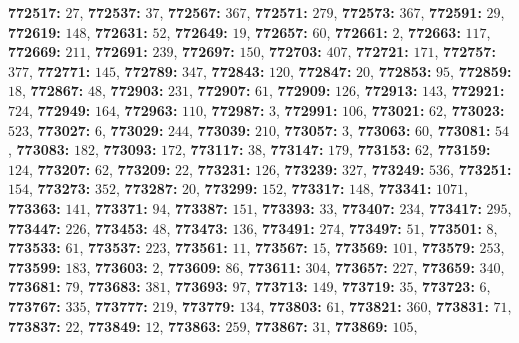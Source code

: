 \textsf{\bfseries 772517:} $27$, \textsf{\bfseries 772537:} $37$, \textsf{\bfseries 772567:} $367$, \textsf{\bfseries 772571:} $279$, \textsf{\bfseries 772573:} $367$, \textsf{\bfseries 772591:} $29$, \textsf{\bfseries 772619:} $148$, \textsf{\bfseries 772631:} $52$, \textsf{\bfseries 772649:} $19$, \textsf{\bfseries 772657:} $60$, \textsf{\bfseries 772661:} $2$, \textsf{\bfseries 772663:} $117$, \textsf{\bfseries 772669:} $211$, \textsf{\bfseries 772691:} $239$, \textsf{\bfseries 772697:} $150$, \textsf{\bfseries 772703:} $407$, \textsf{\bfseries 772721:} $171$, \textsf{\bfseries 772757:} $377$, \textsf{\bfseries 772771:} $145$, \textsf{\bfseries 772789:} $347$, \textsf{\bfseries 772843:} $120$, \textsf{\bfseries 772847:} $20$, \textsf{\bfseries 772853:} $95$, \textsf{\bfseries 772859:} $18$, \textsf{\bfseries 772867:} $48$, \textsf{\bfseries 772903:} $231$, \textsf{\bfseries 772907:} $61$, \textsf{\bfseries 772909:} $126$, \textsf{\bfseries 772913:} $143$, \textsf{\bfseries 772921:} $724$, \textsf{\bfseries 772949:} $164$, \textsf{\bfseries 772963:} $110$, \textsf{\bfseries 772987:} $3$, \textsf{\bfseries 772991:} $106$, \textsf{\bfseries 773021:} $62$, \textsf{\bfseries 773023:} $523$, \textsf{\bfseries 773027:} $6$, \textsf{\bfseries 773029:} $244$, \textsf{\bfseries 773039:} $210$, \textsf{\bfseries 773057:} $3$, \textsf{\bfseries 773063:} $60$, \textsf{\bfseries 773081:} $54$, \textsf{\bfseries 773083:} $182$, \textsf{\bfseries 773093:} $172$, \textsf{\bfseries 773117:} $38$, \textsf{\bfseries 773147:} $179$, \textsf{\bfseries 773153:} $62$, \textsf{\bfseries 773159:} $124$, \textsf{\bfseries 773207:} $62$, \textsf{\bfseries 773209:} $22$, \textsf{\bfseries 773231:} $126$, \textsf{\bfseries 773239:} $327$, \textsf{\bfseries 773249:} $536$, \textsf{\bfseries 773251:} $154$, \textsf{\bfseries 773273:} $352$, \textsf{\bfseries 773287:} $20$, \textsf{\bfseries 773299:} $152$, \textsf{\bfseries 773317:} $148$, \textsf{\bfseries 773341:} $1071$, \textsf{\bfseries 773363:} $141$, \textsf{\bfseries 773371:} $94$, \textsf{\bfseries 773387:} $151$, \textsf{\bfseries 773393:} $33$, \textsf{\bfseries 773407:} $234$, \textsf{\bfseries 773417:} $295$, \textsf{\bfseries 773447:} $226$, \textsf{\bfseries 773453:} $48$, \textsf{\bfseries 773473:} $136$, \textsf{\bfseries 773491:} $274$, \textsf{\bfseries 773497:} $51$, \textsf{\bfseries 773501:} $8$, \textsf{\bfseries 773533:} $61$, \textsf{\bfseries 773537:} $223$, \textsf{\bfseries 773561:} $11$, \textsf{\bfseries 773567:} $15$, \textsf{\bfseries 773569:} $101$, \textsf{\bfseries 773579:} $253$, \textsf{\bfseries 773599:} $183$, \textsf{\bfseries 773603:} $2$, \textsf{\bfseries 773609:} $86$, \textsf{\bfseries 773611:} $304$, \textsf{\bfseries 773657:} $227$, \textsf{\bfseries 773659:} $340$, \textsf{\bfseries 773681:} $79$, \textsf{\bfseries 773683:} $381$, \textsf{\bfseries 773693:} $97$, \textsf{\bfseries 773713:} $149$, \textsf{\bfseries 773719:} $35$, \textsf{\bfseries 773723:} $6$, \textsf{\bfseries 773767:} $335$, \textsf{\bfseries 773777:} $219$, \textsf{\bfseries 773779:} $134$, \textsf{\bfseries 773803:} $61$, \textsf{\bfseries 773821:} $360$, \textsf{\bfseries 773831:} $71$, \textsf{\bfseries 773837:} $22$, \textsf{\bfseries 773849:} $12$, \textsf{\bfseries 773863:} $259$, \textsf{\bfseries 773867:} $31$, \textsf{\bfseries 773869:} $105$, 
